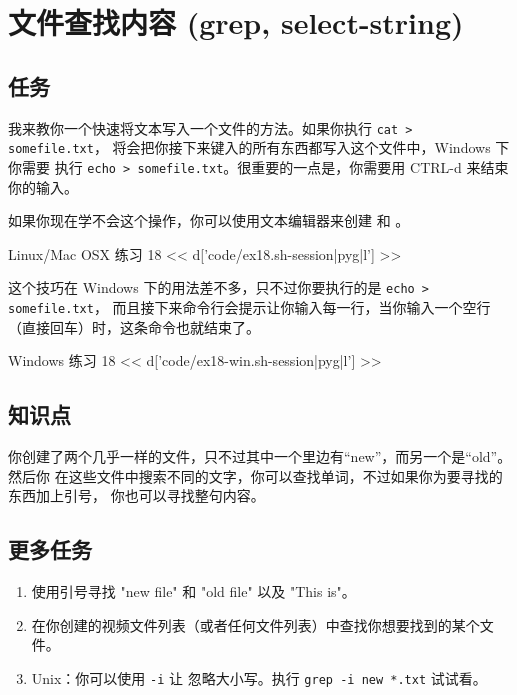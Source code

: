 \chapter{文件查找内容 (grep, select-string)}

\section{任务}

我来教你一个快速将文本写入一个文件的方法。如果你执行 \verb|cat > somefile.txt|，
 将会把你接下来键入的所有东西都写入这个文件中，Windows 下你需要
执行 \verb|echo > somefile.txt|。很重要的一点是，你需要用 CTRL-d 来结束你的输入。

如果你现在学不会这个操作，你可以使用文本编辑器来创建  和 
。

\begin{code}{Linux/Mac OSX 练习 18}
<< d['code/ex18.sh-session|pyg|l'] >>
\end{code}

这个技巧在 Windows 下的用法差不多，只不过你要执行的是 \verb|echo > somefile.txt|，
而且接下来命令行会提示让你输入每一行，当你输入一个空行（直接回车）时，这条命令也就结束了。

\begin{code}{Windows 练习 18}
<< d['code/ex18-win.sh-session|pyg|l'] >>
\end{code}

\section{知识点}

你创建了两个几乎一样的文件，只不过其中一个里边有“new”，而另一个是“old”。然后你
在这些文件中搜索不同的文字，你可以查找单词，不过如果你为要寻找的东西加上引号，
你也可以寻找整句内容。

\section{更多任务}

\begin{enumerate}
\item 使用引号寻找 "new file" 和 "old file" 以及 "This is"。
\item 在你创建的视频文件列表（或者任何文件列表）中查找你想要找到的某个文件。
\item Unix：你可以使用 \verb|-i| 让  忽略大小写。执行 \verb|grep -i new *.txt| 试试看。
\end{enumerate}

